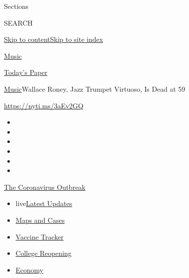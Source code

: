 Sections

SEARCH

\protect\hyperlink{site-content}{Skip to
content}\protect\hyperlink{site-index}{Skip to site index}

\href{https://www.nytimes3xbfgragh.onion/section/arts/music}{Music}

\href{https://myaccount.nytimes3xbfgragh.onion/auth/login?response_type=cookie\&client_id=vi}{}

\href{https://www.nytimes3xbfgragh.onion/section/todayspaper}{Today's
Paper}

\href{/section/arts/music}{Music}\textbar{}Wallace Roney, Jazz Trumpet
Virtuoso, Is Dead at 59

\url{https://nyti.ms/3aEv2GQ}

\begin{itemize}
\item
\item
\item
\item
\item
\item
\end{itemize}

\href{https://www.nytimes3xbfgragh.onion/news-event/coronavirus?action=click\&pgtype=Article\&state=default\&region=TOP_BANNER\&context=storylines_menu}{The
Coronavirus Outbreak}

\begin{itemize}
\tightlist
\item
  live\href{https://www.nytimes3xbfgragh.onion/2020/08/04/world/coronavirus-covid-19.html?action=click\&pgtype=Article\&state=default\&region=TOP_BANNER\&context=storylines_menu}{Latest
  Updates}
\item
  \href{https://www.nytimes3xbfgragh.onion/interactive/2020/us/coronavirus-us-cases.html?action=click\&pgtype=Article\&state=default\&region=TOP_BANNER\&context=storylines_menu}{Maps
  and Cases}
\item
  \href{https://www.nytimes3xbfgragh.onion/interactive/2020/science/coronavirus-vaccine-tracker.html?action=click\&pgtype=Article\&state=default\&region=TOP_BANNER\&context=storylines_menu}{Vaccine
  Tracker}
\item
  \href{https://www.nytimes3xbfgragh.onion/2020/08/02/us/covid-college-reopening.html?action=click\&pgtype=Article\&state=default\&region=TOP_BANNER\&context=storylines_menu}{College
  Reopening}
\item
  \href{https://www.nytimes3xbfgragh.onion/live/2020/08/03/business/stock-market-today-coronavirus?action=click\&pgtype=Article\&state=default\&region=TOP_BANNER\&context=storylines_menu}{Economy}
\end{itemize}

